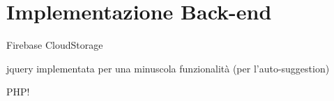 \section{Implementazione Back-end}

Firebase CloudStorage 

jquery implementata per una minuscola funzionalità (per l'auto-suggestion)

PHP!